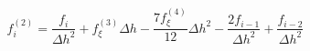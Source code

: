 \begin{equation} 
f^{{(2)}}_{i} = \frac{f_{i}}{{\Delta h}^{2}} + f^{{(3)}}_{{\xi}} {\Delta h} - \frac{7 f^{{(4)}}_{{\xi}}}{12} {\Delta h}^{2} - \frac{2 f_{{i-1}}}{{\Delta h}^{2}} + \frac{f_{{i-2}}}{{\Delta h}^{2}}
 \end{equation} 
